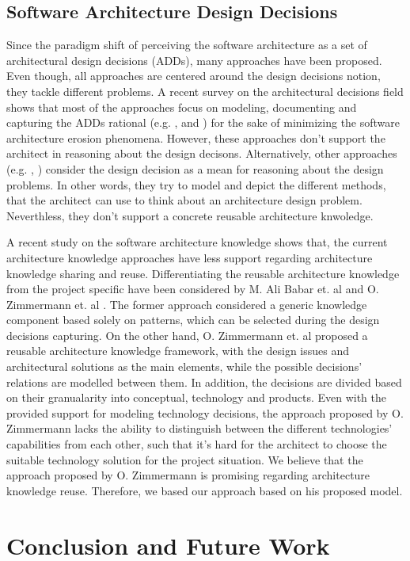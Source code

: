 \documentclass[conference]{IEEEtran}
\begin{document}
\subsection{Software Architecture Design Decisions}
Since the paradigm shift \cite{Jansen2005} of perceiving the software
architecture as a set of architectural design decisions (ADDs), many approaches
have been proposed. Even though, all approaches are centered around the design
decisions notion, they tackle different problems. A recent survey
\cite{AvgeriouSurvey2014} on the architectural decisions field shows that most
of the approaches focus on modeling, documenting and capturing the ADDs rational
(e.g. \cite{Kruchten2006}, \cite{Heesch2012} and \cite{KruchtenEmperical2008})
for the sake of minimizing the software architecture erosion phenomena. However,
these approaches don't support the architect in reasoning about the design
decisons. Alternatively, other approaches (e.g. \cite{LagoMindset},
\cite{TangReasoning2008}) consider the design decision as a mean for reasoning
about the design problems. In other words, they try to model and
depict the different methods, that the architect can use to think about an
architecture design problem. Neverthless, they don't support a concrete reusable
architecture knwoledge.

A recent study on the software architecture knowledge
\cite{WeinreichSurvey} shows that, the current architecture knowledge approaches
have less support regarding architecture knowledge sharing and reuse.
Differentiating the reusable architecture knowledge from the project specific have been
considered by M. Ali Babar et. al \cite{BabarAK} and O. Zimmermann et. al
\cite{Zimmermann2009, Soliman2014}. The former approach considered a generic
knowledge component based solely on patterns, which can be selected during the design
decisions capturing. On the other hand, O. Zimmermann et. al proposed a reusable
architecture knowledge framework, with the design issues and architectural
solutions as the main elements, while the possible decisions' relations are
modelled between them. In addition, the decisions are divided based on their
granualarity into conceptual, technology and products. Even with the provided
support for modeling technology decisions, the approach proposed by O.
Zimmermann lacks the ability to distinguish between the different technologies'
capabilities from each other, such that it's hard for the architect to choose
the suitable technology solution for the project situation. We believe that the
approach proposed by O. Zimmermann is promising regarding architecture knowledge
reuse. Therefore, we based our approach based on his proposed model.
\section{Conclusion and Future Work}
\label{sec:conclusion}


\end{document}
